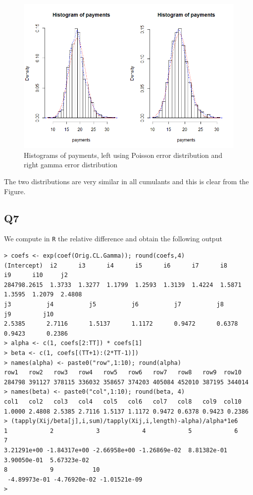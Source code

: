 \documentclass[11pt]{article}
\begin{document}
\begin{center}
	\begin{figure}[H]
		
		\includegraphics[scale=0.75]{Question6_NL5.png}
		
		\caption{Histograms of payments, left using Poisson error distribution and right gamma error distribution}
		\label{Figure_Question6}
		
	\end{figure}
\end{center}

The two distributions are very similar in all cumulants and this is clear from the Figure.


\subsection*{Q7}
We compute in \verb|R| the relative difference and obtain the following output 
\begin{verbatim}
> coefs <- exp(coef(Orig.CL.Gamma)); round(coefs,4)
(Intercept)  i2      i3      i4      i5      i6      i7      i8      i9      i10     j2 
284798.2615  1.3733  1.3277  1.1799  1.2593  1.3139  1.4224  1.5871  1.3595  1.2079  2.4808 
j3          j4          j5          j6          j7          j8          j9         j10 
2.5385      2.7116      1.5137      1.1172      0.9472      0.6378      0.9423      0.2386 
> alpha <- c(1, coefs[2:TT]) * coefs[1]
> beta <- c(1, coefs[(TT+1):(2*TT-1)])
> names(alpha) <- paste0("row",1:10); round(alpha)
row1   row2   row3   row4   row5   row6   row7   row8   row9  row10 
284798 391127 378115 336032 358657 374203 405084 452010 387195 344014 
> names(beta) <- paste0("col",1:10); round(beta, 4)
col1   col2   col3   col4   col5   col6   col7   col8   col9  col10 
1.0000 2.4808 2.5385 2.7116 1.5137 1.1172 0.9472 0.6378 0.9423 0.2386 
> (tapply(Xij/beta[j],i,sum)/tapply(Xij,i,length)-alpha)/alpha*1e6
1            2            3            4            5            6            7            
3.21291e+00 -1.84317e+00 -2.66958e+00 -1.26869e-02  8.81382e-01  3.90050e-01  5.67323e-02
8            9           10 
 -4.89973e-01 -4.76920e-02 -1.01521e-09 
>
\end{verbatim}
\end{document}
